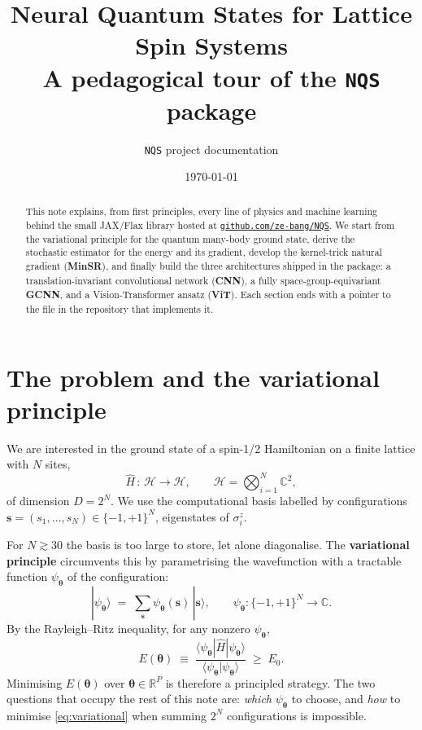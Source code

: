 \documentclass[11pt,a4paper]{article}
\title{\bfseries Neural Quantum States for Lattice Spin Systems\\[2pt]
       \large A pedagogical tour of the \texttt{NQS} package}
\author{\texttt{NQS} project documentation}
\date{\today}
\newcommand{\R}{\mathbb{R}}
\newcommand{\C}{\mathbb{C}}
\newcommand{\bs}{\bm{s}}
\newcommand{\btheta}{\bm{\theta}}
\newcommand{\Hop}{\hat{H}}
\newcommand{\psip}{\psi_{\btheta}}
\theoremstyle{definition}
\theoremstyle{plain}
\begin{document}
\maketitle

\begin{abstract}
\noindent
This note explains, from first principles, every line of physics and machine
learning behind the small JAX/Flax library hosted at
\href{https://github.com/ze-bang/NQS}{\texttt{github.com/ze-bang/NQS}}.
We start from the variational principle for the quantum many-body ground
state, derive the stochastic estimator for the energy and its gradient,
develop the kernel-trick natural gradient (\textbf{MinSR}), and finally
build the three architectures shipped in the package: a translation-invariant
convolutional network (\textbf{CNN}), a fully space-group-equivariant
\textbf{GCNN}, and a Vision-Transformer ansatz (\textbf{ViT}). Each
section ends with a pointer to the file in the repository that implements it.
\end{abstract}

\tableofcontents
\bigskip

\section{The problem and the variational principle}

We are interested in the ground state of a spin-1/2 Hamiltonian on a finite
lattice with $N$ sites,
\begin{equation}
   \Hop \,:\, \mathcal{H} \to \mathcal{H}, \qquad
   \mathcal{H} = \bigotimes_{i=1}^{N} \C^{2},
\end{equation}
of dimension $D = 2^{N}$. We use the computational basis labelled by
configurations $\bs = (s_{1}, \dots, s_{N}) \in \{-1, +1\}^{N}$,
eigenstates of $\sigma^{z}_{i}$.

For $N \gtrsim 30$ the basis is too large to store, let alone diagonalise.
The \textbf{variational principle} circumvents this by parametrising the
wavefunction with a tractable function $\psip$ of the configuration:
\begin{equation}
   |\psip\rangle \;=\; \sum_{\bs} \psip(\bs)\,|\bs\rangle,
   \qquad
   \psip : \{-1,+1\}^{N} \to \C.
\end{equation}
By the Rayleigh--Ritz inequality, for any nonzero $\psip$,
\begin{equation}
\boxed{\;
   E(\btheta) \;\equiv\;
   \frac{\langle\psip|\Hop|\psip\rangle}{\langle\psip|\psip\rangle}
   \;\geq\; E_{0}.
\;}
\label{eq:variational}
\end{equation}
Minimising $E(\btheta)$ over $\btheta \in \R^{P}$ is therefore a principled
strategy. The two questions that occupy the rest of this note are:
\emph{which} $\psip$ to choose, and \emph{how} to minimise
\eqref{eq:variational} when summing $2^{N}$ configurations is impossible.
\end{document}
